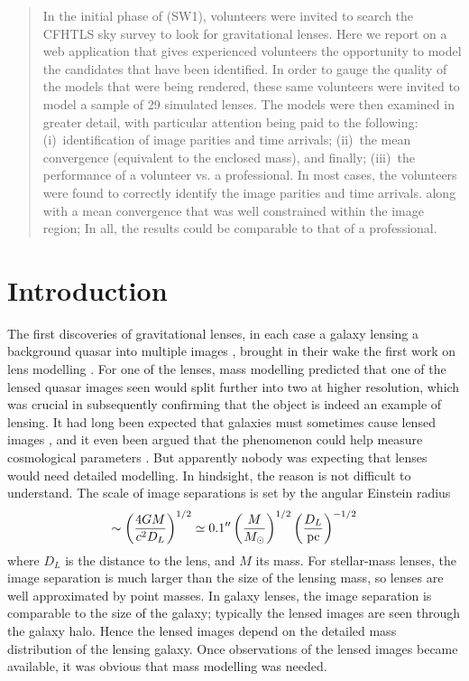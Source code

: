 \begin{abstract}
In the initial phase of \sw (SW1), volunteers were invited to search the CFHTLS sky survey to look for gravitational lenses.
Here we report on a web application that gives experienced volunteers the opportunity to model the candidates that have been identified.
In order to gauge the quality of the models that were being rendered, these same volunteers were invited to model a sample of 29 simulated lenses.
The models were then examined in greater detail, with particular attention being paid to the following:
(i)~identification of image parities and time arrivals;
(ii)~the mean convergence (equivalent to the enclosed mass), and finally;
(iii)~the performance of a volunteer vs. a professional.
In most cases, the volunteers were found to correctly identify the image parities and time arrivals.
 along with a mean convergence that was well constrained within the image region;
In all, the results could be comparable to that of a professional.
\end{abstract}

\begin{keywords}
\end{keywords}

\section{Introduction}

The first discoveries of gravitational lenses, in each case a galaxy
lensing a background quasar into multiple images
\citep{1979Natur.279..381W,1980Natur.285..641W}, brought in their wake
the first work on lens modelling
\citep{1981ApJ...244..723Y,1981ApJ...244..736Y}.  For one of the
lenses, mass modelling predicted that one of the lensed quasar images
seen would split further into two at higher resolution, which was
crucial in subsequently confirming that the object is indeed an
example of lensing.  It had long been expected that galaxies must
sometimes cause lensed images \citep{1937ApJ....86..217Z}, and it even
been argued that the phenomenon could help measure cosmological
parameters \citep{1964MNRAS.128..307R,1966MNRAS.132..101R}.  But
apparently nobody was expecting that lenses would need detailed
modelling.  In hindsight, the reason is not difficult to understand.
The scale of image separations is set by the angular Einstein radius
\begin{equation}
\sim \left(\frac{4GM}{c^2 D_L}\right)^{1/2}
\simeq 0.1'' \left(\frac{M}{M_\odot}\right)^{1/2}
             \left(\frac{D_L}{\rm pc}\right)^{-1/2}
\end{equation}
where $D_L$ is the distance to the lens, and $M$ its mass.  For
stellar-mass lenses, the image separation is much larger than the size
of the lensing mass, so lenses are well approximated by point masses.
In galaxy lenses, the image separation is comparable to the size of
the galaxy; typically the lensed images are seen through the galaxy
halo.  Hence the lensed images depend on the detailed mass
distribution of the lensing galaxy.  Once observations of the lensed
images became available, it was obvious that mass modelling was
needed.

